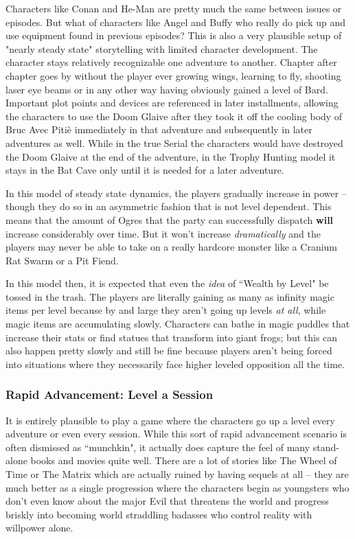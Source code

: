 Characters like Conan and He-Man are pretty much the same between issues or episodes. But what of characters like Angel and Buffy who really do pick up and use equipment found in previous episodes? This is also a very plausible setup of "nearly steady state" storytelling with limited character development. The character stays relatively recognizable one adventure to another. Chapter after chapter goes by without the player ever growing wings, learning to fly, shooting laser eye beams or in any other way having obviously gained a level of Bard. Important plot points and devices are referenced in later installments, allowing the characters to use the Doom Glaive after they took it off the cooling body of Bruc Avec Piti\`{e} immediately in that adventure and subsequently in later adventures as well. While in the true Serial the characters would have destroyed the Doom Glaive at the end of the adventure, in the Trophy Hunting model it stays in the Bat Cave only until it is needed for a later adventure.

In this model of steady state dynamics, the players gradually increase in power -- though they do so in an asymmetric fashion that is not level dependent. This means that the amount of Ogres that the party can successfully dispatch \textbf{will} increase considerably over time. But it won't increase \textit{dramatically} and the players may never be able to take on a really hardcore monster like a Cranium Rat Swarm or a Pit Fiend.

In this model then, it is expected that even the \textit{idea} of ``Wealth by Level" be tossed in the trash. The players are literally gaining as many as infinity magic items per level because by and large they aren't going up levels \textit{at all}, while magic items are accumulating slowly. Characters can bathe in magic puddles that increase their stats or find statues that transform into giant frogs; but this can also happen pretty slowly and still be fine because players aren't being forced into situations where they necessarily face higher leveled opposition all the time.

\subsubsection{Rapid Advancement: Level a Session}
\vspace*{-8pt}

It is entirely plausible to play a game where the characters go up a level every adventure or even every session. While this sort of rapid advancement scenario is often dismissed as ``munchkin", it actually does capture the feel of many stand-alone books and movies quite well. There are a lot of stories like The Wheel of Time or The Matrix which are actually ruined by having sequels at all -- they are much better as a single progression where the characters begin as youngsters who don't even know about the major Evil that threatens the world and progress briskly into becoming world straddling badasses who control reality with willpower alone.

